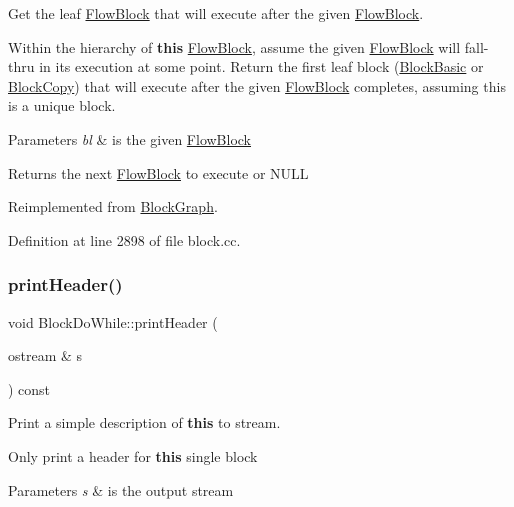 Get the leaf \mbox{\hyperlink{class_flow_block}{Flow\+Block}} that will execute after the given \mbox{\hyperlink{class_flow_block}{Flow\+Block}}. 

Within the hierarchy of {\bfseries{this}} \mbox{\hyperlink{class_flow_block}{Flow\+Block}}, assume the given \mbox{\hyperlink{class_flow_block}{Flow\+Block}} will fall-\/thru in its execution at some point. Return the first leaf block (\mbox{\hyperlink{class_block_basic}{Block\+Basic}} or \mbox{\hyperlink{class_block_copy}{Block\+Copy}}) that will execute after the given \mbox{\hyperlink{class_flow_block}{Flow\+Block}} completes, assuming this is a unique block. 
\begin{DoxyParams}{Parameters}
{\em bl} & is the given \mbox{\hyperlink{class_flow_block}{Flow\+Block}} \\
\hline
\end{DoxyParams}
\begin{DoxyReturn}{Returns}
the next \mbox{\hyperlink{class_flow_block}{Flow\+Block}} to execute or N\+U\+LL 
\end{DoxyReturn}


Reimplemented from \mbox{\hyperlink{class_block_graph_aba0d42cf572bdcf2bca44d22fad971f6}{Block\+Graph}}.



Definition at line 2898 of file block.\+cc.

\mbox{\label{class_block_do_while_a95baa39da580d08f36b507fefe61823f}} 
\subsubsection{\texorpdfstring{printHeader()}{printHeader()}}
{\footnotesize\ttfamily void Block\+Do\+While\+::print\+Header (\begin{DoxyParamCaption}\item[{ostream \&}]{s }\end{DoxyParamCaption}) const\hspace{0.3cm}{\ttfamily [virtual]}}



Print a simple description of {\bfseries{this}} to stream. 

Only print a header for {\bfseries{this}} single block 
\begin{DoxyParams}{Parameters}
{\em s} & is the output stream \\
\hline
\end{DoxyParams}


